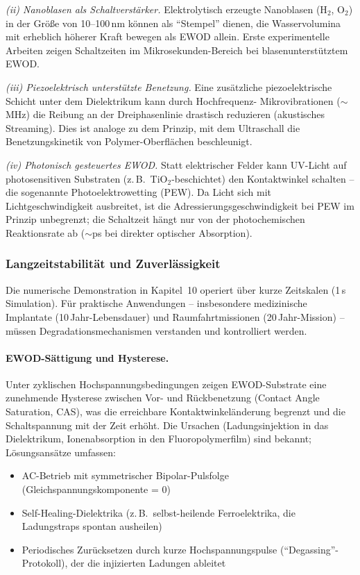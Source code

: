 ﻿\documentclass[a4paper,12pt]{scrreprt}
\theoremstyle{definition}
\begin{document}
\textit{(ii) Nanoblasen als Schaltverstärker.} Elektrolytisch erzeugte
Nanoblasen (H$_2$, O$_2$) in der Größe von 10--100\,nm können als
``Stempel'' dienen, die Wasservolumina mit erheblich höherer Kraft
bewegen als EWOD allein. Erste experimentelle Arbeiten zeigen
Schaltzeiten im Mikrosekunden-Bereich bei blasenunterstütztem EWOD.

\textit{(iii) Piezoelektrisch unterstützte Benetzung.} Eine zusätzliche
piezoelektrische Schicht unter dem Dielektrikum kann durch Hochfrequenz-
Mikrovibrationen ($\sim$MHz) die Reibung an der Dreiphasenlinie
drastisch reduzieren (akustisches Streaming). Dies ist analoge zu dem
Prinzip, mit dem Ultraschall die Benetzungskinetik von Polymer-Oberflächen
beschleunigt.

\textit{(iv) Photonisch gesteuertes EWOD.} Statt elektrischer Felder
kann UV-Licht auf photosensitiven Substraten (z.\,B.\ TiO$_2$-beschichtet)
den Kontaktwinkel schalten -- die sogenannte Photoelektrowetting
(PEW). Da Licht sich mit Lichtgeschwindigkeit ausbreitet, ist die
Adressierungsgeschwindigkeit bei PEW im Prinzip unbegrenzt; die
Schaltzeit hängt nur von der photochemischen Reaktionsrate ab
($\sim$ps bei direkter optischer Absorption).

\subsubsection{Langzeitstabilität und Zuverlässigkeit}
\label{subsubsec:stabilitaet}

Die numerische Demonstration in Kapitel~10 operiert über kurze
Zeitskalen (1\,s Simulation). Für praktische Anwendungen -- insbesondere
medizinische Implantate (10\,Jahr-Lebensdauer) und Raumfahrtmissionen
(20\,Jahr-Mission) -- müssen Degradationsmechanismen verstanden
und kontrolliert werden.

\paragraph{EWOD-Sättigung und Hysterese.}
Unter zyklischen Hochspannungsbedingungen zeigen EWOD-Substrate eine
zunehmende Hysterese zwischen Vor- und Rückbenetzung (Contact Angle
Saturation, CAS), was die erreichbare Kontaktwinkeländerung begrenzt
und die Schaltspannung mit der Zeit erhöht. Die Ursachen (Ladungsinjek\-tion
in das Dielektrikum, Ionenabsorption in den Fluoropolymerfilm) sind
bekannt; Lösungsansätze umfassen:
\begin{itemize}
	\item AC-Betrieb mit symmetrischer Bipolar-Pulsfolge
	(Gleichspannungskomponente = 0)
	\item Self-Healing-Dielektrika (z.\,B.\ selbst-heilende Ferroelektrika,
	die Ladungstraps spontan ausheilen)
	\item Periodisches Zurücksetzen durch kurze Hochspannungspulse
	(``Degassing''-Protokoll), der die injizierten Ladungen ableitet
\end{itemize}
\end{document}
